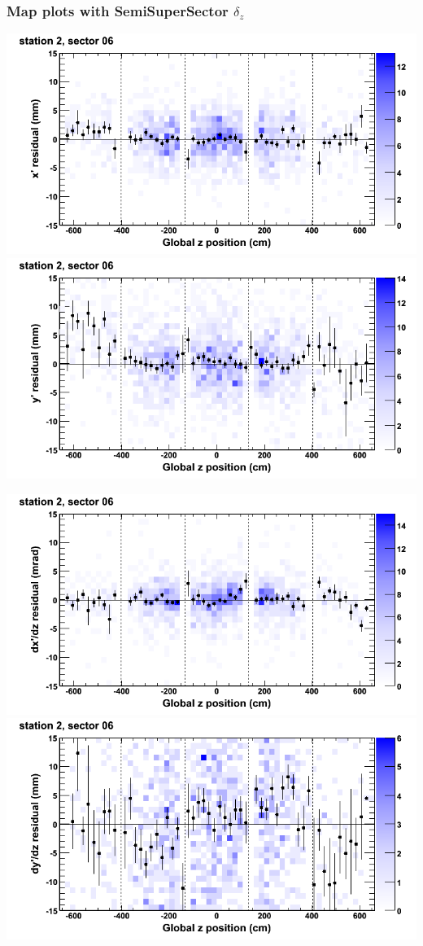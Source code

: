 \documentclass[compress]{beamer}
\begin{document}
\begin{frame}
\frametitle{Map plots with SemiSuperSector $\delta_z$}
\includegraphics[width=0.5\linewidth]{zfit_mapplots/DTvsz_st2sec06_x.png}
\includegraphics[width=0.5\linewidth]{zfit_mapplots/DTvsz_st2sec06_y.png}

\includegraphics[width=0.5\linewidth]{zfit_mapplots/DTvsz_st2sec06_dxdz.png}
\includegraphics[width=0.5\linewidth]{zfit_mapplots/DTvsz_st2sec06_dydz.png}
\end{frame}
\end{document}
